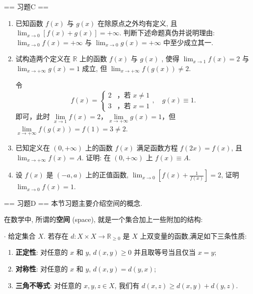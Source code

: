 == 习题C ==

\begin{enumerate}
    \item[1.]已知函数 $f(x)$ 与 $g(x)$ 在除原点之外均有定义, 且 $\displaystyle\lim_{x \to 0} [f(x) + g(x)] = +\infty$. 
    判断下述命题真伪并说明理由: $\displaystyle\lim_{x \to 0} f(x) = +\infty$ 与 $\displaystyle\lim_{x \to 0} g(x) = +\infty$ 中至少成立其一.

    \item[2.]试构造两个定义在 $\mathbb{R}$ 上的函数 $f(x)$ 与 $g(x)$ , 使得 $\displaystyle\lim_{x \to 1} f(x) = 2$ 
    与 $\displaystyle\lim_{x \to +\infty} g(x) = 1$ 成立, 
    但 $\displaystyle\lim_{x \to +\infty} f(g(x)) \neq 2$.
    \begin{solution}
        令
        \[
        f(x)=\begin{cases}
            2 & \text{，若 } x\neq 1 \\
            3 & \text{，若 } x=1
        \end{cases},\quad 
        g(x)\equiv 1.
        \]
        即可，此时 $\underset{x\to 1}{\lim}f(x)=2$，$\underset{x\to +\infty}{\lim}g(x)=1$，但 $\underset{x\to +\infty}{\lim}f(g(x))=f(1)=3\neq 2$.
    \end{solution}

    \item[3.]已知定义在 $(0, +\infty)$ 上的函数 $f(x)$ 满足函数方程 $f(2x) = f(x)$, 且 $\displaystyle\lim_{x \to +\infty} f(x) = A$. 
    证明: 在 $(0, +\infty)$ 上 $f(x) \equiv A$.

    \item[4.]设 $f(x)$ 是 $(-a, a)$ 上的正值函数, $\displaystyle\lim_{x \to 0} \left[f(x) + \frac{1}{f(x)}\right] = 2$, 
    证明 $\displaystyle\lim_{x \to 0} f(x) = 1$.
\end{enumerate}

== 习题D ==
本节习题主要介绍空间的概念.

在数学中, 所谓的\textbf{空间} (space), 就是一个集合加上一些附加的结构:

$\cdot$ 给定集合 $X$. 若存在 $d:X\times X\to \mathbb{R}_{\geq 0}$ 是 $X$ 上双变量的函数,满足如下三条性质:

\begin{enumerate}
    \item[(a)]\textbf{正定性}: 对任意的 $x$ 和 $y$, $d(x, y) \geq 0$ 并且取等号当且仅当 $x = y$;
    \item[(b)]\textbf{对称性}: 对任意的 $x$ 和 $y$, $d(x, y) = d(y, x)$;
    \item[(c)]\textbf{三角不等式}: 对任意的 $x, y, z \in X$, 我们有 $d(x, z) \geq d(x, y) + d(y, z)$.
\end{enumerate}

